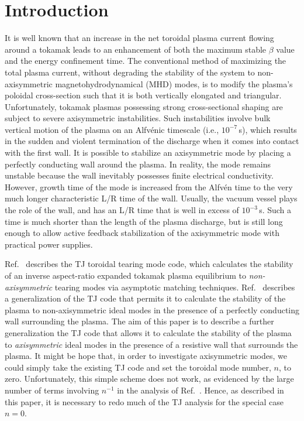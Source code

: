\documentclass[12pt,prb,aps]{revtex4-1}
\begin{document}
\section{Introduction}
It is well known that an increase in  the net toroidal plasma current flowing around a tokamak  leads to an enhancement of both the maximum stable $\beta$ value and the energy confinement time.\cite{troyon,goldston}
The conventional method of maximizing the total plasma current, without degrading the  stability of the system to non-axisymmetric magnetohydrodynamical (MHD) modes, is
to modify the plasma's poloidal cross-section such that it is both vertically elongated and triangular.\cite{jet}  Unfortunately, tokamak plasmas possessing strong cross-sectional shaping
are subject to severe axisymmetric instabilities.\cite{v1,v2} Such instabilities involve bulk vertical motion of the plasma on an Alfv\'{e}nic timescale (i.e., $10^{-7}$\,s), which results in the
sudden and violent termination of the  discharge when it comes into contact with the first wall. It is possible to stabilize an axisymmetric mode by placing a perfectly conducting wall
around the plasma. In reality, the mode remains unstable because  the wall inevitably possesses finite electrical conductivity.\cite{rwm}  However, 
growth time of the mode is increased from the Alfv\'{e}n time to the very much longer characteristic L/R time of the wall.\cite{rwm1,rwm1a,rwm2} Usually, the vacuum vessel plays the role of the wall,
and has an L/R time that is  well in excess of  $10^{-3}$\,s. Such a time is much shorter than the length of the plasma 
discharge, but is still long enough to allow active feedback stabilization of the axisymmetric mode with practical power supplies.\cite{rwm3} 

Ref.~ describes the TJ toroidal tearing mode code, which calculates the stability of an inverse aspect-ratio expanded  tokamak plasma equilibrium  to {\em non-axisymmetric}\/ tearing modes via
asymptotic matching techniques. Ref.~ describes a generalization of the TJ code that permits it to calculate the stability of the plasma to non-axisymmetric
ideal modes in the presence of a perfectly conducting wall surrounding the plasma. The aim of this paper is to describe a further generalization the TJ code that  allows it to calculate
the stability of the plasma to {\em axisymmetric}\/ ideal modes in the presence of a resistive wall that surrounds the plasma. It might be hope that, in order to investigate axisymmetric
modes,  we could simply take the existing
TJ code and set the toroidal mode number, $n$, to zero. Unfortunately, this simple scheme does not work, as evidenced by the large number of terms involving
$n^{-1}$ in the analysis of Ref.~. Hence, as described in this paper, it is necessary to redo  much of the TJ analysis for the special case $n=0$. 
\end{document}

